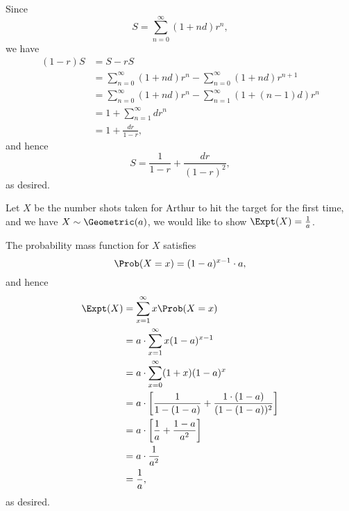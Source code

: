 \Question{\currfilebase}

Since
\[
    S = \sum_{n = 0}^{\infty} (1 + nd) r^n,
\]
we have
\begin{align*}
    (1 - r)S & = S - rS                                                                        \\
             & = \sum_{n = 0}^{\infty} (1 + nd) r^n - \sum_{n = 0}^{\infty} (1 + nd) r^{n + 1} \\
             & = \sum_{n = 0}^{\infty} (1 + nd) r^n - \sum_{n = 1}^{\infty} (1 + (n - 1)d) r^n \\
             & = 1 + \sum_{n = 1}^{\infty} d r^n                                               \\
             & = 1 + \frac{dr}{1 - r},
\end{align*}
and hence
\[
    S = \frac{1}{1 - r} + \frac{dr}{(1 - r)^2},
\]
as desired.

Let \(X\) be the number shots taken for Arthur to hit the target for the first time, and we have \(X \sim \Geometric(a)\), we would like to show \(\Expt(X) = \frac{1}{a}\).

The probability mass function for \(X\) satisfies
\[
    \Prob(X = x) = (1 - a)^{x - 1} \cdot a,
\]
and hence
\begin{align*}
    \Expt(X) & = \sum_{x = 1}^{\infty} x \Prob(X = x)                                                 \\
             & = a \cdot \sum_{x = 1}^{\infty} x (1 - a)^{x - 1}                                      \\
             & = a \cdot \sum_{x = 0}^{\infty} (1 + x) (1 - a)^{x}                                    \\
             & = a \cdot \left[\frac{1}{1 - (1 - a)} + \frac{1 \cdot (1 - a)}{(1 - (1 - a))^2}\right] \\
             & = a \cdot \left[\frac{1}{a} + \frac{1 - a}{a^2}\right]                                 \\
             & = a \cdot \frac{1}{a^2}                                                                \\
             & = \frac{1}{a},
\end{align*}
as desired.

